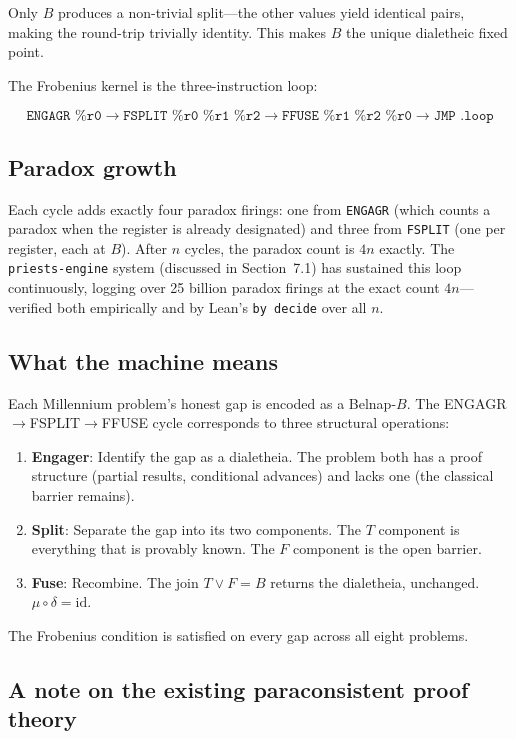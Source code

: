 \documentclass[11pt,a4paper]{article}
\theoremstyle{definition}
\begin{document}
Only $B$ produces a non-trivial split---the other values yield identical
pairs, making the round-trip trivially identity. This makes $B$ the unique
dialetheic fixed point.

The Frobenius kernel is the three-instruction loop:

\[
\texttt{ENGAGR \%r0} \to \texttt{FSPLIT \%r0 \%r1 \%r2} \to
\texttt{FFUSE \%r1 \%r2 \%r0} \to \texttt{JMP .loop}
\]

\subsection{Paradox growth}

Each cycle adds exactly four paradox firings: one from {\tt ENGAGR} (which
counts a paradox when the register is already designated) and three from
{\tt FSPLIT} (one per register, each at $B$). After $n$ cycles, the paradox
count is $4n$ exactly. The {\tt priests-engine} system (discussed in
Section~7.1) has sustained this loop continuously, logging over 25 billion
paradox firings at the exact count $4n$---verified both empirically and by
Lean's {\tt by decide} over all $n$.

\subsection{What the machine means}

Each Millennium problem's honest gap is encoded as a Belnap-$B$. The
ENGAGR$\to$FSPLIT$\to$FFUSE cycle corresponds to three structural operations:

\begin{enumerate}
  \item {\bf Engager}: Identify the gap as a dialetheia. The problem both has
        a proof structure (partial results, conditional advances) and lacks
        one (the classical barrier remains).
  \item {\bf Split}: Separate the gap into its two components. The $T$
        component is everything that is provably known. The $F$ component is
        the open barrier.
  \item {\bf Fuse}: Recombine. The join $T \vee F = B$ returns the dialetheia,
        unchanged. $\mu \circ \delta = \text{id}$.
\end{enumerate}

The Frobenius condition is satisfied on every gap across all eight problems.

\subsection{A note on the existing paraconsistent proof theory}
\end{document}
